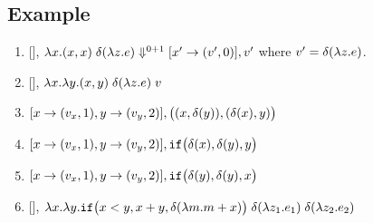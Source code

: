 
\subsection{Example}
\begin{enumerate}
\item{ [], $\lambda x. (x, x) \; \delta{(\lambda z. e)} \mathrel{\Downarrow^{ 0 + 1 }} [x' \to
    (v', 0)], v'  $} where $v' = \delta{( \lambda z. e)}$.
\item{ [], $\lambda x. \lambda y. (x, y) \; \delta{(\lambda z. e) \;v} $}
\item{ $[x \to (v_x, 1), y \to (v_y, 2)], \big( (x , \delta(y) ) ,
    (\delta(x), y) \big) $  }
\item{ $[x \to (v_x, 1), y \to (v_y, 2)], \mathtt{if} \big( \delta(x),
    \delta(y) , y  \big) $  }
\item{ $[x \to (v_x, 1), y \to (v_y, 2)], \mathtt{if} \big( \delta(y),
    \delta(y) , x  \big) $  }
 \item{ [], $\lambda x. \lambda y. \mathtt{if} \big(  x < y , x+y ,
     \delta(\lambda m. m+x )  \big) \; \delta{(\lambda z_1. e_1 ) \;\delta( \lambda z_2. e_2 ) } $}
\end{enumerate} 


